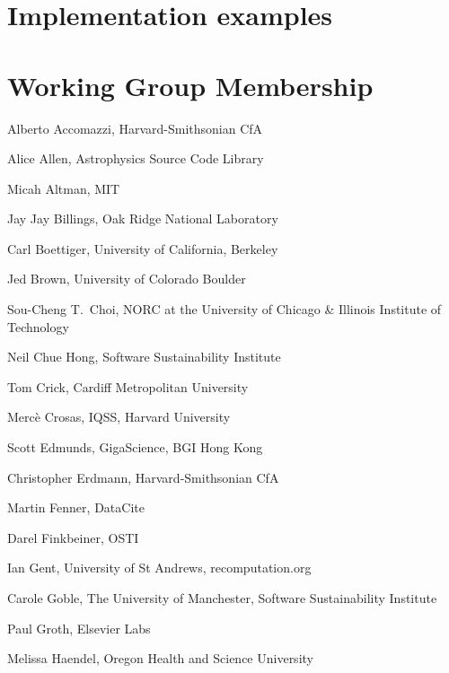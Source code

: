 \documentclass[11pt, oneside]{amsart}
\newcommand{\dmnote}[1]{ {\textcolor{purple} { ***DM: #1 }}} %
\newcommand{\LJHnote}[1]{ {\textcolor{fuschsia} { ***LJH: #1 }}} %
\begin{document}

\section{Implementation examples}
\label{sec:examples}




\appendix

\section{Working Group Membership}
\label{app:wg_members}

Alberto Accomazzi, Harvard-Smithsonian CfA

Alice Allen, Astrophysics Source Code Library

Micah Altman, MIT

Jay Jay Billings, Oak Ridge National Laboratory

Carl Boettiger, University of California,  Berkeley

Jed Brown, University of Colorado Boulder

Sou-Cheng T.~Choi, NORC at the University of Chicago \& Illinois Institute of Technology

Neil Chue Hong, Software Sustainability Institute

Tom Crick, Cardiff Metropolitan University

Merc\`e Crosas, IQSS, Harvard University

Scott Edmunds, GigaScience, BGI Hong Kong

Christopher Erdmann, Harvard-Smithsonian CfA

Martin Fenner, DataCite

Darel Finkbeiner, OSTI

Ian Gent, University of St Andrews, recomputation.org

Carole Goble, The University of Manchester, Software Sustainability Institute

Paul Groth, Elsevier Labs

Melissa Haendel, Oregon Health and Science University
\end{document}
